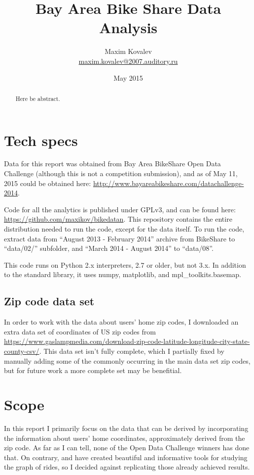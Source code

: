 \documentclass{article}
\title{Bay Area Bike Share Data Analysis}
\author{Maxim Kovalev\\\href{mailto:maxim.kovalev@2007.auditory.ru?subject=Bay Area BikeShare Data Analysis}{maxim.kovalev@2007.auditory.ru}}
\date{May 2015}
\begin{document}
\maketitle

\begin{abstract}
Here be abstract.
\end{abstract}

\section{Tech specs}
Data for this report was obtained from Bay Area BikeShare Open Data Challenge (although this is not a competition submission), and as of May 11, 2015 could be obtained here: \url{http://www.bayareabikeshare.com/datachallenge-2014}.

Code for all the analytics is published under GPLv3, and can be found here: \url{https://github.com/maxikov/bikedatan}. This repository contains the entire distribution needed to run the code, except for the data itself. To run the code, extract data from ``August 2013 - February 2014'' archive from BikeShare to ``data/02/'' subfolder, and ``March 2014 - August 2014'' to ``data/08''.

This code runs on Python 2.x interpreters, 2.7 or older, but not 3.x. In addition to the standard library, it uses numpy, matplotlib, and mpl\_toolkits.basemap.

\subsection{Zip code data set}

In order to work with the data about users' home zip codes, I downloaded an extra data set of coordinates of US zip codes from \url{https://www.gaslampmedia.com/download-zip-code-latitude-longitude-city-state-county-csv/}. This data set isn't fully complete, which I partially fixed by manually adding some of the commonly occurring in the main data set zip codes, but for future work a more complete set may be benefitial.

\section{Scope}

In this report I primarily focus on the data that can be derived by incorporating the information about users' home coordinates, approximately derived from the zip code. As far as I can tell, none of the Open Data Challenge winners has done that. On contrary, \cite{mousebird} and \cite{planetbabs} have created beautiful and informative tools for studying the graph of rides, so I decided against replicating those already achieved results.
\end{document}
